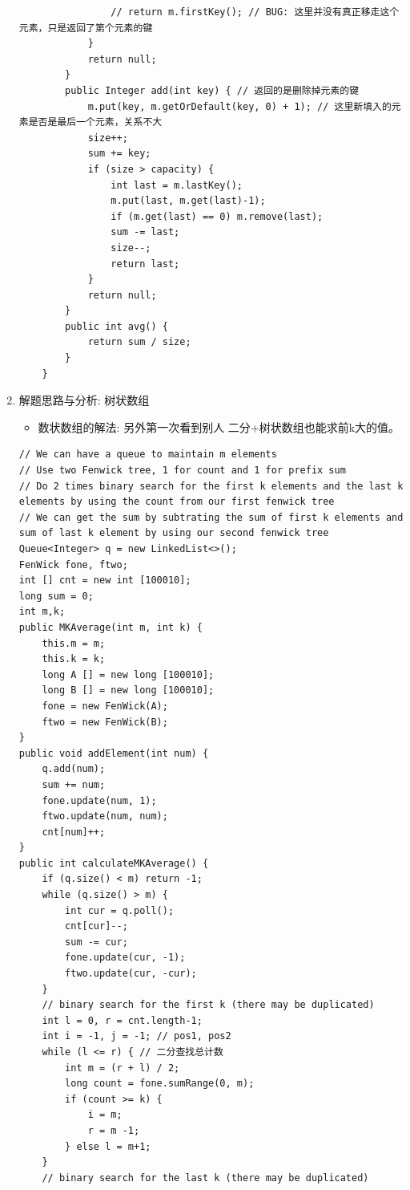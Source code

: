 \documentclass[9pt, b5paaper]{book}
\begin{document}
\begin{enumerate}
\begin{verbatim}
                // return m.firstKey(); // BUG: 这里并没有真正移走这个元素，只是返回了第个元素的键
            }
            return null;
        }
        public Integer add(int key) { // 返回的是删除掉元素的键
            m.put(key, m.getOrDefault(key, 0) + 1); // 这里新填入的元素是否是最后一个元素，关系不大
            size++;
            sum += key;
            if (size > capacity) {
                int last = m.lastKey();
                m.put(last, m.get(last)-1);
                if (m.get(last) == 0) m.remove(last);
                sum -= last;
                size--;
                return last;
            }
            return null;
        }
        public int avg() {
            return sum / size;
        }
    }
\end{verbatim}
\item 解题思路与分析: 树状数组
\label{sec-1-0-2-2}
\begin{itemize}
\item 数状数组的解法: 另外第一次看到别人 二分+树状数组也能求前k大的值。
\end{itemize}
\begin{verbatim}
// We can have a queue to maintain m elements
// Use two Fenwick tree, 1 for count and 1 for prefix sum
// Do 2 times binary search for the first k elements and the last k elements by using the count from our first fenwick tree
// We can get the sum by subtrating the sum of first k elements and sum of last k element by using our second fenwick tree
Queue<Integer> q = new LinkedList<>();
FenWick fone, ftwo;
int [] cnt = new int [100010];
long sum = 0;
int m,k;
public MKAverage(int m, int k) {
    this.m = m;
    this.k = k;
    long A [] = new long [100010];
    long B [] = new long [100010];
    fone = new FenWick(A);
    ftwo = new FenWick(B);
}
public void addElement(int num) {
    q.add(num);
    sum += num;
    fone.update(num, 1);
    ftwo.update(num, num);
    cnt[num]++;
}
public int calculateMKAverage() {
    if (q.size() < m) return -1;
    while (q.size() > m) {
        int cur = q.poll();
        cnt[cur]--;
        sum -= cur;
        fone.update(cur, -1);
        ftwo.update(cur, -cur);
    }
    // binary search for the first k (there may be duplicated)
    int l = 0, r = cnt.length-1;
    int i = -1, j = -1; // pos1, pos2 
    while (l <= r) { // 二分查找总计数
        int m = (r + l) / 2;
        long count = fone.sumRange(0, m);
        if (count >= k) {
            i = m;
            r = m -1;
        } else l = m+1;
    }
    // binary search for the last k (there may be duplicated)

\end{verbatim}
\end{enumerate}
\end{document}
